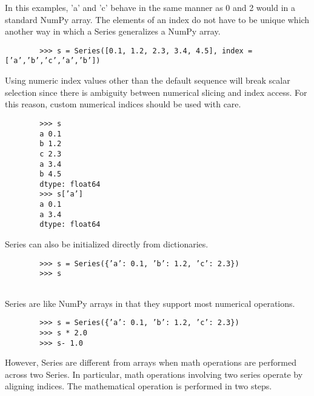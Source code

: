 \documentclass[KSmain.tex]{subfiles}
\begin{document}
	In this examples, ’a’ and ’c’ behave in the same manner as 0 and 2 would in a standard NumPy
	array. The elements of an index do not have to be unique which another way in which a Series generalizes
	a NumPy array.
	\begin{framed}
		\begin{verbatim}
		>>> s = Series([0.1, 1.2, 2.3, 3.4, 4.5], index = [’a’,’b’,’c’,’a’,’b’])
		\end{verbatim}
	\end{framed}
	Using numeric index values other than the default sequence will break scalar selection since there is ambiguity between
	numerical slicing and index access. For this reason, custom numerical indices should be used with care.
	\begin{framed}
		\begin{verbatim}
		>>> s
		a 0.1
		b 1.2
		c 2.3
		a 3.4
		b 4.5
		dtype: float64
		>>> s[’a’]
		a 0.1
		a 3.4
		dtype: float64
		\end{verbatim}
	\end{framed}
		Series can also be initialized directly from dictionaries.
		\begin{framed}
		\begin{verbatim}
		>>> s = Series({’a’: 0.1, ’b’: 1.2, ’c’: 2.3})
		>>> s
		
		\end{verbatim}
	\end{framed}
	Series are like NumPy arrays in that they support most numerical operations.
	\begin{framed}
		\begin{verbatim}
		>>> s = Series({’a’: 0.1, ’b’: 1.2, ’c’: 2.3})
		>>> s * 2.0
		>>> s- 1.0
	\end{verbatim}
	\end{framed}
	However, Series are different from arrays when math operations are performed across two Series. In
	particular, math operations involving two series operate by aligning indices. The mathematical operation
	is performed in two steps. 
	
\end{document}
